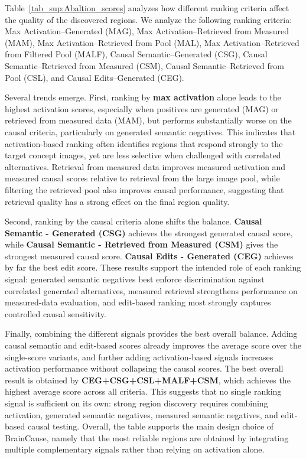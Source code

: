 \documentclass{article}
\begin{document}
Table~\ref{tab_sup:Abaltion_scores} analyzes how different ranking criteria affect the quality of the discovered regions. We analyze the following ranking criteria: Max Activation–Generated (MAG), Max Activation–Retrieved from Measured (MAM), Max Activation–Retrieved from Pool (MAL), Max Activation–Retrieved from Filtered Pool (MALF), Causal Semantic–Generated (CSG), Causal Semantic–Retrieved from Measured (CSM), Causal Semantic–Retrieved from Pool (CSL), and Causal Edits–Generated (CEG).

Several trends emerge. First, ranking by \textbf{max activation} alone leads to the highest activation scores, especially when positives are generated (MAG) or retrieved from measured data (MAM), but performs substantially worse on the causal criteria, particularly on generated semantic negatives. This indicates that activation-based ranking often identifies regions that respond strongly to the target concept images, yet are less selective when challenged with correlated alternatives. Retrieval from measured data improves measured activation and measured causal scores relative to retrieval from the large image pool, while filtering the retrieved pool also improves causal performance, suggesting that retrieval quality has a strong effect on the final region quality.

Second, ranking by the causal criteria alone shifts the balance. \textbf{Causal Semantic - Generated (CSG)} achieves the strongest generated causal score, while \textbf{Causal Semantic - Retrieved from Measured (CSM)} gives the strongest measured causal score. \textbf{Causal Edits - Generated (CEG)} achieves by far the best edit score. These results support the intended role of each ranking signal: generated semantic negatives best enforce discrimination against correlated generated alternatives, measured retrieval strengthens performance on measured-data evaluation, and edit-based ranking most strongly captures controlled causal sensitivity.

Finally, combining the different signals provides the best overall balance. Adding causal semantic and edit-based scores already improves the average score over the single-score variants, and further adding activation-based signals increases activation performance without collapsing the causal scores. The best overall result is obtained by \textbf{CEG+CSG+CSL+MALF+CSM}, which achieves the highest average score across all criteria. This suggests that no single ranking signal is sufficient on its own: strong region discovery requires combining activation, generated semantic negatives, measured semantic negatives, and edit-based causal testing. Overall, the table supports the main design choice of BrainCause, namely that the most reliable regions are obtained by integrating multiple complementary signals rather than relying on activation alone.
\end{document}
